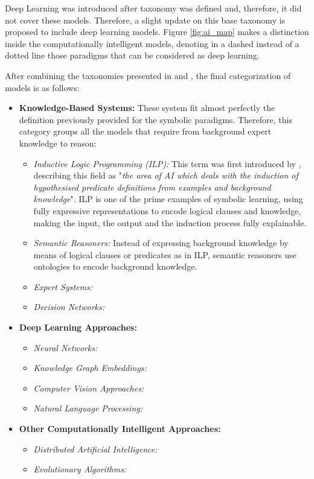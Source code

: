 Deep Learning was introduced after \cite{hopgood_2009_knowledge-based} taxonomy was defined and, therefore, it did not cover these models. Therefore, a slight update on this base taxonomy is proposed to include deep learning models. Figure \ref{fig:ai_map} makes a distinction inside the computationally intelligent models, denoting in a dashed instead of a dotted line those paradigms that can be considered as deep learning. 

After combining the taxonomies presented in \cite{hopgood_2009_knowledge-based} and \cite{corea_ai_2019}, the final categorization of models is as follows:
\begin{itemize}
    \item \textbf{Knowledge-Based Systems:} These system fit almost perfectly the definition previously provided for the symbolic paradigms. Therefore, this category groups all the models that require from background expert knowledge to reason:
    \begin{itemize}
        \item \textit{Inductive Logic Programming (ILP):} This term was first introduced by \cite{Muggleton1991}, describing this field as "\textit{the area of AI which deals with the induction of hypothesised predicate definitions from examples and background knowledge}". ILP is one of the prime examples of symbolic learning, using fully expressive representations to encode logical clauses and knowledge, making the input, the output and the induction process fully explainable.
        \item \textit{Semantic Reasoners:} Instead of expressing background knowledge by means of logical clauses or predicates as in ILP, semantic reasoners use ontologies to encode background knowledge. 
        \item \textit{Expert Systems:}
        \item \textit{Decision Networks:}
    \end{itemize}
    \item \textbf{Deep Learning Approaches:}
    \begin{itemize}
        \item \textit{Neural Networks:}
        \item \textit{Knowledge Graph Embeddings:}
        \item \textit{Computer Vision Approaches:}
        \item \textit{Natural Language Processing:}
    \end{itemize}
    \item \textbf{Other Computationally Intelligent Approaches:}
    \begin{itemize}
        \item \textit{Distributed Artificial Intelligence:}
        \item \textit{Evolutionary Algorithms:}
    \end{itemize}
\end{itemize}

